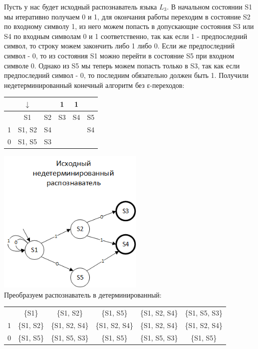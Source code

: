\documentclass[a4paper,14pt]{extarticle}
\begin{document}
\begin{enumerate}[1.]
Пусть у нас будет исходный распознаватель языка $L_3$. В начальном состоянии S1 мы итеративно 
получаем 0 и 1, для окончания работы переходим в состояние S2 по входному символу
1, из него можем попасть в допускающие состояния S3 или S4 по входным символам 0 и 1 соответственно, 
так как если 1 - предпоследний символ, то строку можем закончить либо 1 либо 0. 
Если же предпоследний символ - 0, то из состояния S1 можно перейти в состояние S5 
при входном символе 0. Однако из S5 мы теперь можем попасть только в S3, так как если предпоследний 
символ - 0, то последним обязательно должен быть 1. Получили недетерминированный конечный алгоритм
без ε-переходов:\\
\begin{tabular}{|c|c|c|c|c|c|}
    \hline
    & $\downarrow$ & & 1 & 1 & \\
    \hline
    & S1 & S2 & S3 & S4 & S5 \\
    \hline
    1 & S1, S2 & S4 & & & S4 \\
    \hline
    0 & S1, S5 & S3 & & & \\
    \hline
\end{tabular}
\includegraphics[width=70mm]{task3_non_determined}\\

Преобразуем распознаватель в детерминированный:\\
\begin{tabular}{|c|c|c|c|c|c|}
    \hline
    & & & & &\\
    \hline
    & \{S1\} & \{S1, S2\} & \{S1, S5\} & \{S1, S2, S4\} & \{S1, S5, S3\}\\
    \hline
    1 & \{S1, S2\} & \{S1, S2, S4\} & \{S1, S2, S4\} & \{S1, S2, S4\} & \{S1, S2, S4\}\\
    \hline
    0 & \{S1, S5\} & \{S1, S5, S3\} & \{S1, S5\} & \{S1, S5, S3\} & \{S1, S5\}\\
    \hline
\end{tabular} 


\end{enumerate}
\end{document}
